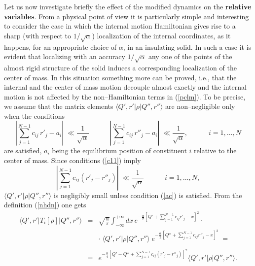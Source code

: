 \documentclass[12pt]{article}
\begin{document}
Let us now investigate briefly the effect of the modified dynamics
on the {\bf relative variables}. From a physical point of view it
is particularly simple and interesting to consider the case in
which the internal motion Hamiltonian gives rise to a sharp (with
respect to $1/\sqrt{\alpha}$) localization of the internal
coordinates, as it happens, for an appropriate choice of $\alpha$, in
an insulating solid. In such a case it is evident that localizing
with an accuracy $1/\sqrt{\alpha}$ any one of the points of the
almost rigid structure of the solid induces a corresponding
localization of the center  of mass. In this situation something
more can be proved, i.e., that the internal and the center  of
mass motion decouple almost exactly and the internal motion is not
affected by the non--Hamiltonian terms in (\ref{pclm}). To be
precise, we assume that the matrix elements $\langle
Q',r'|\rho|Q'',r''\rangle$ are non--negligible only when the
conditions
\begin{equation} \label{c11}
| \sum_{j=1}^{N-1} c_{ij}\, {r'}_{j} - a_{i} | \; \ll
\frac{1}{\sqrt{\alpha}} \qquad\quad | \sum_{j=1}^{N-1} c_{ij}\,
{r''}_{j} - a_{i} | \; \ll \frac{1}{\sqrt{\alpha}}, \qquad\quad i
= 1, \ldots, N
\end{equation}
are satisfied, $a_{i}$ being the equilibrium position of
constituent $i$ relative to the center  of mass. Since conditions
(\ref{c11}) imply
\begin{equation} \label{ac}
| \sum_{j=1}^{N-1} c_{ij} ({r'}_{j} - {r''}_{j}) | \; \ll
\frac{1}{\sqrt{\alpha}} \qquad \quad i = 1, \ldots, N,
\end{equation}
$\langle Q',r'|\rho|Q'',r''\rangle$ is negligibly small unless
condition (\ref{ac}) is satisfied. From the definition
(\ref{nhdn}) one gets
\begin{eqnarray} \label{vslp}
\langle Q',r'|T_{i}[\rho]|Q'',r''\rangle & = &
\sqrt{\frac{\alpha}{\pi}} \int_{-\infty}^{+\infty} dx\,
e^{\displaystyle -\frac{\alpha}{2} \left[Q' + \sum_{j=1}^{N-1}
c_{ij} {r'}_{j} - x \right]^{2}}\cdot \nonumber \\
& & \cdot\; \langle Q',r'|\rho|Q'',r''\rangle\; e^{\displaystyle
-\frac{\alpha}{2} \left[Q'' + \sum_{j=1}^{N-1}
c_{ij} {r''}_{j} - x \right]^{2}}\; = \nonumber \\
& & \nonumber \\ & = & e^{\displaystyle -\frac{\alpha}{4} \left[Q'
- Q'' + \sum_{j=1}^{N-1} c_{ij} ({r'}_{j} - {r''}_{j})
\right]^{2}}
\langle Q',r'|\rho|Q'',r''\rangle. \nonumber \\
& &
\end{eqnarray}
\end{document}
